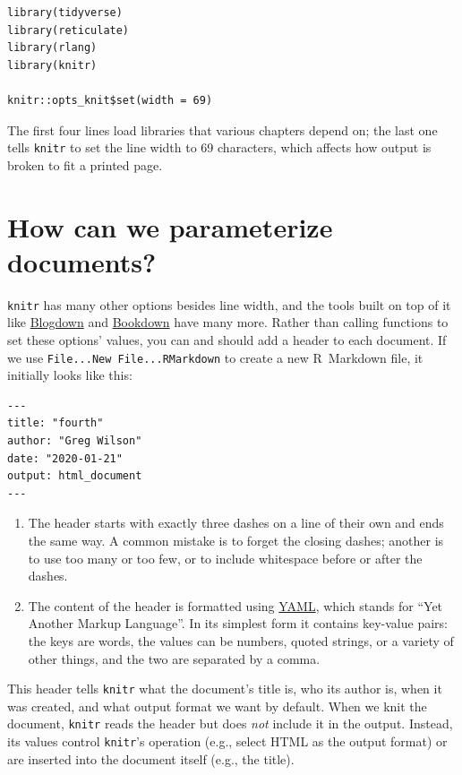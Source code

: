 \begin{lstlisting}
library(tidyverse)
library(reticulate)
library(rlang)
library(knitr)

knitr::opts_knit$set(width = 69)
\end{lstlisting}

The first four lines load libraries that various chapters depend on;
the last one tells \texttt{knitr} to set the line width to 69 characters,
which affects how output is broken to fit a printed page.

\section{How can we parameterize documents?}

\texttt{knitr} has many other options besides line width,
and the tools built on top of it
like \href{https://bookdown.org/yihui/blogdown/}{Blogdown} and \href{https://bookdown.org/}{Bookdown}
have many more.
Rather than calling functions to set these options' values,
you can and should add a header to each document.
If we use \texttt{File...New\ File...RMarkdown} to create a new R~Markdown file,
it initially looks like this:

\begin{lstlisting}
---
title: "fourth"
author: "Greg Wilson"
date: "2020-01-21"
output: html_document
---
\end{lstlisting}

\begin{enumerate}
\item
  The header starts with exactly three dashes on a line of their own and ends the same way.
  A common mistake is to forget the closing dashes;
  another is to use too many or too few,
  or to include whitespace before or after the dashes.
\item
  The content of the header is formatted using \href{https://yaml.org/}{YAML},
  which stands for ``Yet Another Markup Language''.
  In its simplest form it contains key-value pairs:
  the keys are words,
  the values can be numbers, quoted strings, or a variety of other things,
  and the two are separated by a comma.
\end{enumerate}

This header tells \texttt{knitr} what the document's title is,
who its author is,
when it was created,
and what output format we want by default.
When we knit the document,
\texttt{knitr} reads the header but does \emph{not} include it in the output.
Instead,
its values control \texttt{knitr}'s operation (e.g., select HTML as the output format)
or are inserted into the document itself (e.g., the title).


